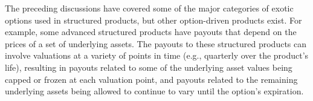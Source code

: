 \documentclass[11pt]{article}
\begin{document}
The preceding discussions have covered some of the major categories of exotic options used in structured products, but other option-driven products exist. For example, some advanced structured products have payouts that depend on the prices of a set of underlying assets. The payouts to these structured products can involve valuations at a variety of points in time (e.g., quarterly over the product's life), resulting in payouts related to some of the underlying asset values being capped or frozen at each valuation point, and payouts related to the remaining underlying assets being allowed to continue to vary until the option's expiration.
\end{document}

